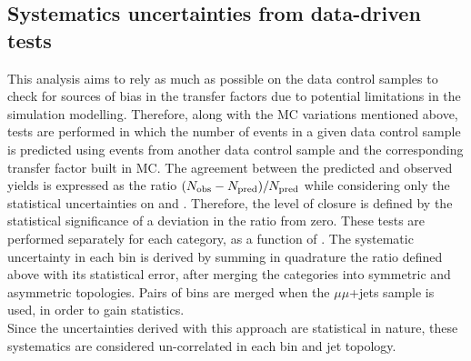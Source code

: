 


\newpage

\subsection{Systematics uncertainties from data-driven tests}
\label{sec:closure-tests}
This analysis aims to rely as much as possible on the data control samples
to check for sources of bias in the transfer factors due to potential limitations in
the simulation modelling. 
Therefore, along with the MC variations mentioned above, tests are performed 
in which the number of events in a given data control sample is predicted 
using events from another data control sample and the corresponding transfer factor built in MC. 
The agreement between the predicted and observed yields is
expressed as the ratio $(N_{\textrm{obs}} - N_{\textrm{pred}})/N_{\textrm{pred}}$ while considering only
the statistical uncertainties on \npre and \nobs. Therefore, the level
of closure is defined by the statistical significance of a deviation
in the ratio from zero.
These tests are performed separately for each \njet category, as a function of \scalht. 
The systematic uncertainty in each \scalht bin is derived by summing in quadrature the ratio 
defined above with its statistical error, after merging the \njet categories into symmetric and asymmetric topologies. 
Pairs of \scalht bins are merged when the $\mu\mu$+jets sample is used, in order to gain statistics. \\
Since the uncertainties derived with this approach are statistical in nature, 
these systematics are considered un-correlated in each \scalht bin and jet topology. 


